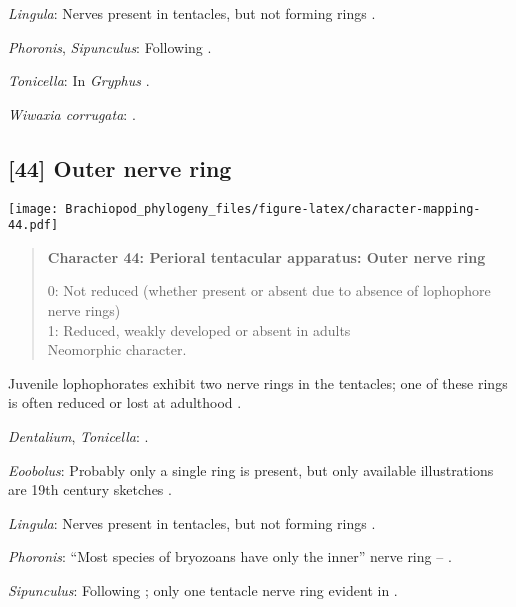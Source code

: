 \documentclass[openany]{book}
\theoremstyle{definition}
\theoremstyle{definition}
\theoremstyle{definition}
\theoremstyle{remark}
\begin{document}
\hypertarget{Lingula-coding-43}{}
\emph{Lingula}: Nerves present in tentacles, but not forming rings
\citep{Fuchs2006}.

\hypertarget{Phoronis-coding-43}{}
\emph{Phoronis}, \emph{Sipunculus}: Following
\citet{Temereva2017Innervationof}.

\hypertarget{Tonicella-coding-43}{}
\emph{Tonicella}: In \emph{Gryphus} \citep{Temereva2017Thefirst}.

\hypertarget{Wiwaxia_corrugata-coding-43}{}
\emph{Wiwaxia corrugata}: \citep{Temereva2017Innervationof}.

\subsection*{{[}44{]} Outer nerve ring}\label{outer-nerve-ring}

\texttt{[image: Brachiopod\_phylogeny\_files/figure-latex/character-mapping-44.pdf]}

\begin{quote}
\textbf{Character 44: Perioral tentacular apparatus: Outer nerve ring}

0: Not reduced (whether present or absent due to absence of lophophore
nerve rings)\\
1: Reduced, weakly developed or absent in adults\\
Neomorphic character.
\end{quote}

Juvenile lophophorates exhibit two nerve rings in the tentacles; one of
these rings is often reduced or lost at adulthood
\citep{Temereva2017Innervationof}.

\hypertarget{Dentalium-coding-44}{}
\emph{Dentalium}, \emph{Tonicella}: \citet{Temereva2017Innervationof}.

\hypertarget{Eoobolus-coding-44}{}
\emph{Eoobolus}: Probably only a single ring is present, but only
available illustrations are 19th century sketches \citep{Luter2016}.

\hypertarget{Lingula-coding-44}{}
\emph{Lingula}: Nerves present in tentacles, but not forming rings
\citep{Fuchs2006}.

\hypertarget{Phoronis-coding-44}{}
\emph{Phoronis}: ``Most species of bryozoans have only the inner'' nerve
ring -- \citet{Temereva2017Innervationof}.

\hypertarget{Sipunculus-coding-44}{}
\emph{Sipunculus}: Following \citet{Temereva2017Innervationof}; only one
tentacle nerve ring evident in \citet{Temereva2016Thenervous}.
\end{document}
